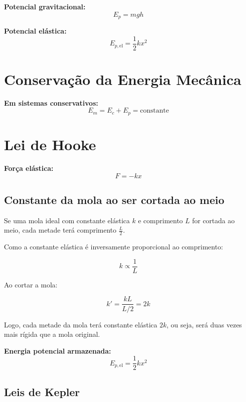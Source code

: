 \documentclass[a4paper,12pt]{article}
\begin{document}
\begin{multicols}{2}
\textbf{Potencial gravitacional:}
\begin{equation*}
  E_p = m g h
\end{equation*}

\textbf{Potencial elástica:}
\begin{equation*}
  E_{p,\text{el}} = \frac{1}{2} k x^2
\end{equation*}

\section{Conservação da Energia Mecânica}

\textbf{Em sistemas conservativos:}
\begin{equation*}
  E_m = E_c + E_p = \text{constante}
\end{equation*}

\section{Lei de Hooke}

\textbf{Força elástica:}
\begin{equation*}
  F = -k x
\end{equation*}

\subsection{Constante da mola ao ser cortada ao meio}

Se uma mola ideal com constante elástica \( k \) e comprimento \( L \) for cortada ao meio, cada metade terá comprimento \( \frac{L}{2} \).

Como a constante elástica é inversamente proporcional ao comprimento:

\[
k \propto \frac{1}{L}
\]

Ao cortar a mola:

\[
k' = \frac{kL}{L/2} = 2k
\]

Logo, cada metade da mola terá constante elástica \( 2k \), ou seja, será duas vezes mais rígida que a mola original.

\textbf{Energia potencial armazenada:}
\begin{equation*}
  E_{p,\text{el}} = \frac{1}{2} k x^2
\end{equation*}

\subsection{Leis de Kepler}


\end{multicols}
\end{document}
